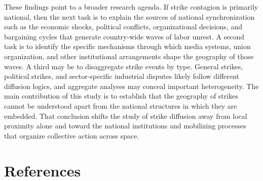 \documentclass[
  11pt,
]{article}
\begin{document}
These findings point to a broader research agenda. If strike contagion
is primarily national, then the next task is to explain the sources of
national synchronization such as the economic shocks, political
conflicts, organizational decisions, and bargaining cycles that generate
country-wide waves of labor unrest. A second task is to identify the
specific mechanisms through which media systems, union organization, and
other institutional arrangements shape the geography of those waves. A
third may be to disaggregate strike events by type. General strikes,
political strikes, and sector-specific industrial disputes likely follow
different diffusion logics, and aggregate analyses may conceal important
heterogeneity. The main contribution of this study is to establish that
the geography of strikes cannot be understood apart from the national
structures in which they are embedded. That conclusion shifts the study
of strike diffusion away from local proximity alone and toward the
national institutions and mobilizing processes that organize collective
action across space.

\newpage

\section{References}\label{references}

\setlength{\parindent}{-0.2in}
\setlength{\leftskip}{0.2in}
\setlength{\parskip}{8pt}
\noindent
\end{document}
